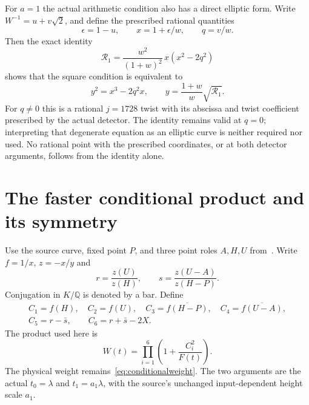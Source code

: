 \documentclass[11pt,a4paper]{article}
\newcommand{\Q}{\mathbb Q}\newcommand{\Z}{\mathbb Z}
\begin{document}
For $a=1$ the actual arithmetic condition also has a direct elliptic
form. Write $W^{-1}=u+v\sqrt2$, and define the prescribed rational
quantities
\[
              \epsilon=1-u,\qquad x=1+\epsilon/w,\qquad q=v/w.
\]
Then the exact identity
\begin{equation}\label{eq:elliptic}
          \mathcal R_1=\frac{w^2}{(1+w)^2}\,x(x^2-2q^2)
\end{equation}
shows that the square condition is equivalent to
\[
                  y^2=x^3-2q^2x,\qquad
                  y=\frac{1+w}{w}\sqrt{\mathcal R_1}.
\]
For $q\ne0$ this is a rational $j=1728$ twist with its abscissa and
twist coefficient prescribed by the actual detector. The identity
remains valid at $q=0$; interpreting that degenerate equation as an
elliptic curve is neither required nor used. No rational point with
the prescribed coordinates, or at both detector arguments, follows
from the identity alone.

\section{The faster conditional product and its symmetry}
\label{sec:conditional}

Use the source curve, fixed point $P$, and three point roles $A,H,U$
from~\cite{Conditional}. Write $f=1/x$, $z=-x/y$ and
\[
 r=\frac{z(U)}{z(H)},\qquad
 s=\frac{z(U-A)}{z(H-P)}.
\]
Conjugation in $K/\Q$ is denoted by a bar. Define
\begin{equation}\label{eq:tests}
 \begin{gathered}
 C_1=f(H),\quad C_2=f(U),\quad
 C_3=\overline{f(H-P)},\quad C_4=\overline{f(U-A)},\\
 C_5=r-\bar s,\qquad C_6=r+\bar s-2X.
 \end{gathered}
\end{equation}
The product used here is
\begin{equation}\label{eq:fastproduct}
                  W(t)=\prod_{i=1}^6\left(1+\frac{C_i^2}{F(t)}\right).
\end{equation}
The physical weight remains~\eqref{eq:conditionalweight}. The two
arguments are the actual $t_0=\lambda$ and $t_1=a_1\lambda$, with
the source's unchanged input-dependent height scale $a_1$.
\end{document}
